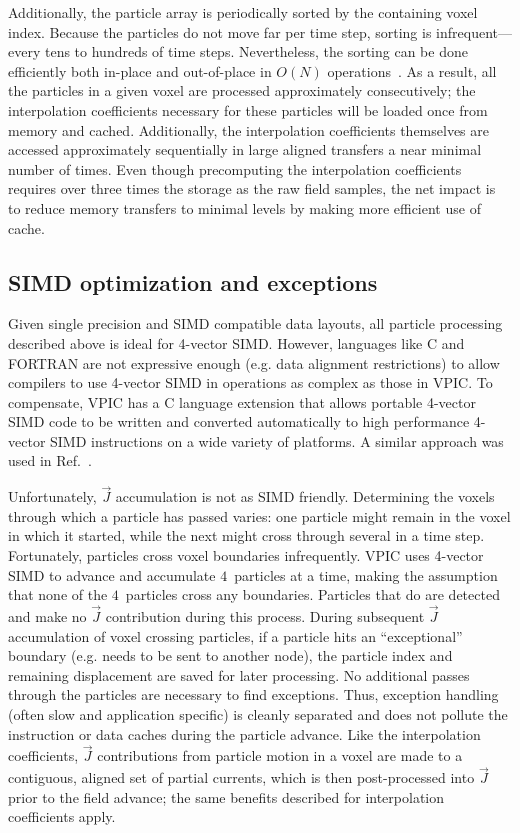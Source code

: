 \documentclass[journal,twoside]{IEEEtran}
\newcommand{\vecJ}{\vec{J}}
\begin{document}
Additionally, the particle array is periodically sorted by the
containing voxel index.  Because the particles do not move far per
time step, sorting is infrequent---every tens to hundreds of time
steps.  Nevertheless, the sorting can be done efficiently both
in-place and out-of-place in $O(N)$ operations~\cite{Bowers_2001}.  As
a result, all the particles in a given voxel are processed
approximately consecutively; the interpolation coefficients necessary
for these particles will be loaded once from memory and cached.
Additionally, the interpolation coefficients themselves are accessed
approximately sequentially in large aligned transfers a near minimal
number of times.  Even though precomputing the interpolation
coefficients requires over three times the storage as the raw field
samples, the net impact is to reduce memory transfers to minimal
levels by making more efficient use of cache.

\subsection{SIMD optimization and exceptions}

Given single precision and SIMD compatible data layouts, all particle
processing described above is ideal for 4-vector SIMD.  However,
languages like C and FORTRAN are not expressive enough (e.g. data
alignment restrictions) to allow compilers to use 4-vector SIMD in
operations as complex as those in VPIC.  To compensate, VPIC has a C
language extension that allows portable 4-vector SIMD code to be
written and converted automatically to high performance 4-vector SIMD
instructions on a wide variety of platforms.  A similar approach was
used in Ref.~\cite{Bowers_et_al_2006}.

Unfortunately, $\vecJ$ accumulation is not as SIMD friendly.
Determining the voxels through which a particle has passed varies: one
particle might remain in the voxel in which it started, while the next
might cross through several in a time step.  Fortunately, particles
cross voxel boundaries infrequently.  VPIC uses 4-vector SIMD to
advance and accumulate $4$~particles at a time, making the assumption that
none of the
$4$~particles cross any boundaries.  Particles that do are detected
and make no $\vecJ$ contribution during this process.  During
subsequent $\vecJ$ accumulation of voxel crossing particles, if a
particle hits an ``exceptional'' boundary (e.g. needs to be sent to
another node), the particle index and remaining displacement are saved
for later processing.  No additional passes through the particles are
necessary to find exceptions.  Thus, exception handling (often slow
and application specific) is cleanly separated and does not pollute
the instruction or data caches during the particle advance.  Like the
interpolation coefficients, $\vecJ$ contributions from particle motion
in a voxel are made to a contiguous, aligned set of partial currents,
which is then post-processed into $\vecJ$ prior to the field advance;
the same benefits described for interpolation coefficients apply.
\end{document}
